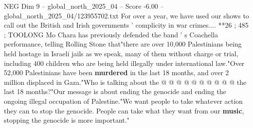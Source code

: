 \begin{textsample}{NEG Dim 9 – global\_north\_2025\_04 – Score -6.00 – global\_north\_2025\_04/123955702.txt}
For over a year, we have used our shows to call out the British and Irish governments ' complicity in war crimes.... **26 ; 485 ; TOOLONG Mo Chara has previously defended the band ' s Coachella performance, telling Rolling Stone that"there are over 10,000 Palestinians being held hostage in Israeli jails as we speak, many of them without charge or trial, including 400 children who are being held illegally under international law."Over 52,000 Palestinians have been \textbf{murdered} in the last 18 months, and over 2 million displaced in Gaza."Who is talking about the @ @ @ @ @ @ @ @ @ @ the last 18 months?"Our message is about ending the genocide and ending the ongoing illegal occupation of Palestine."We want people to take whatever action they can to stop the genocide.
People can take what they want from our \textbf{music}, stopping the genocide is more important."

\end{textsample}
